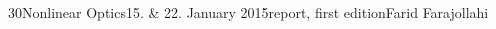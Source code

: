 \documentclass[a4paper, parskip=half, 12pt, bibliography=totocnumbered]{scrartcl}
\begin{document}
{30}{Nonlinear Optics}{15. \& 22. January 2015}{report, first edition}{Farid Farajollahi}{}





\begin{thebibliography}{10}
\end{thebibliography}
\end{document}
